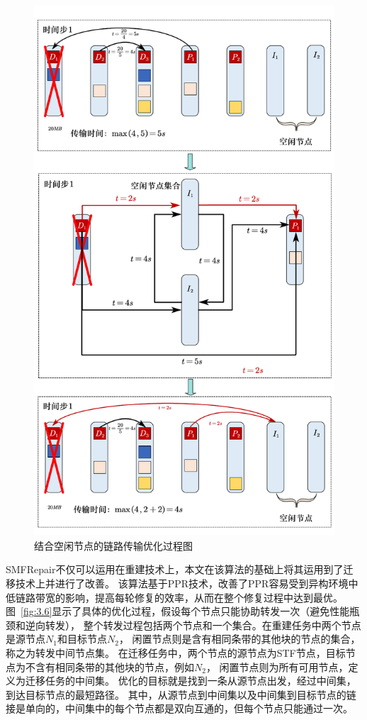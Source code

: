 \begin{figure}[tb!]
	\centering
	\includegraphics [scale=0.5]{figures/3.5.pdf}
	\caption{结合空闲节点的链路传输优化过程图}
	\label{fig:3.5}
\end{figure}

SMFRepair不仅可以运用在重建技术上，本文在该算法的基础上将其运用到了迁移技术上并进行了改善。
该算法基于PPR技术，改善了PPR容易受到异构环境中低链路带宽的影响，提高每轮修复的效率，从而在整个修复过程中达到最优。
图~\ref{fig:3.6}显示了具体的优化过程，假设每个节点只能协助转发一次（避免性能瓶颈和逆向转发），
整个转发过程包括两个节点和一个集合。在重建任务中两个节点是源节点$N_1$和目标节点$N_2$，
闲置节点则是含有相同条带的其他块的节点的集合，称之为转发中间节点集。
在迁移任务中，两个节点的源节点为STF节点，目标节点为不含有相同条带的其他块的节点，例如$N_2$，
闲置节点则为所有可用节点，定义为迁移任务的中间集。
优化的目标就是找到一条从源节点出发，经过中间集，到达目标节点的最短路径。
其中，从源节点到中间集以及中间集到目标节点的链接是单向的，中间集中的每个节点都是双向互通的，但每个节点只能通过一次。

